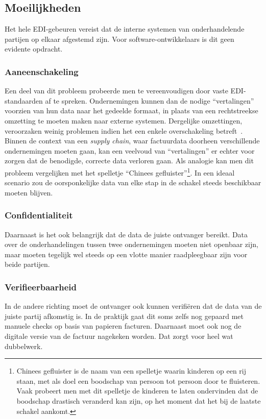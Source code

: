 \subsection{Moeilijkheden}

Het hele EDI-gebeuren vereist dat de interne systemen van onderhandelende partijen op elkaar afgestemd zijn. Voor software-ontwikkelaars is dit geen evidente opdracht. 

\subsubsection{Aaneenschakeling}
Een deel van dit probleem probeerde men te vereenvoudigen door vaste EDI-standaarden af te spreken. Ondernemingen kunnen dan de nodige ``vertalingen'' voorzien van hun data naar het gedeelde formaat, in plaats van een rechtstreekse omzetting te moeten maken naar externe systemen. Dergelijke omzettingen, veroorzaken weinig problemen indien het een enkele overschakeling betreft~\autocite{Damsgaard2000}. Binnen de context van een \textit{supply chain}, waar factuurdata doorheen verschillende ondernemingen moeten gaan, kan een veelvoud van ``vertalingen'' er echter voor zorgen dat de benodigde, correcte data verloren gaan. Als analogie kan men dit probleem vergelijken met het spelletje ``Chinees gefluister''\footnote{Chinees gefluister is de naam van een spelletje waarin kinderen op een rij staan, met als doel een boodschap van persoon tot persoon door te fluisteren. Vaak probeert men met dit spelletje de kinderen te laten ondervinden dat de boodschap drastisch veranderd kan zijn, op het moment dat het bij de laatste schakel aankomt.}. In een ideaal scenario zou de oorsponkelijke data van elke stap in de schakel steeds beschikbaar moeten blijven.


\subsubsection{Confidentialiteit}
Daarnaast is het ook belangrijk dat de data de juiste ontvanger bereikt. Data over de onderhandelingen tussen twee ondernemingen moeten niet openbaar zijn, maar moeten tegelijk wel steeds op een vlotte manier raadpleegbaar zijn voor beide partijen.

\subsubsection{Verifieerbaarheid}

In de andere richting moet de ontvanger ook kunnen verifiëren dat de data van de juiste partij afkomstig is. In de praktijk gaat dit soms zelfs nog gepaard met manuele checks op basis van papieren facturen. Daarnaast moet ook nog de digitale versie van de factuur nagekeken worden. Dat zorgt voor heel wat dubbelwerk. 


